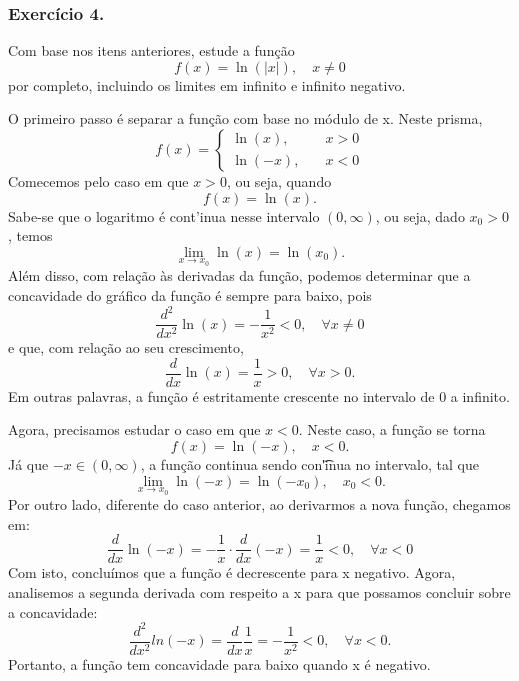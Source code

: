 \subsubsection{Exerc\'icio 4.}
Com base nos itens anteriores, estude a fun\c c\~ao
\[
	f(x) = \ln(|x|), \quad x\neq{0}
\]
por completo, incluindo os limites em infinito e infinito negativo.

\begin{proof*}
	O primeiro passo \'e separar a fun\c c\~ao com base no m\'odulo de x. Neste
	prisma,
	\[
		f(x) = \left\{
		\begin{array}{ll}
			\ln(x), \quad  & x > 0 \\
			\ln(-x), \quad & x < 0
		\end{array}\right.
	\]
	Comecemos pelo caso em que $x > 0$, ou seja, quando
	\[
		f(x) = \ln(x).
	\]
	Sabe-se que o logaritmo \'e cont'inua nesse intervalo $(0, \infty)$, ou seja,
	dado $x_{0}> 0$, temos
	\[
		\lim_{x\to{x_0}}\ln(x) = \ln(x_{0}).
	\]
	Al\'em disso, com rela\c c\~ao \`as derivadas da fun\c c\~ao, podemos
	determinar que a concavidade do gr\'afico da fun\c c\~ao \'e sempre para baixo,
	pois
	\[
		\frac{d^{2}}{dx^{2}}\ln(x) = -\frac{1}{x^{2}}< 0, \quad \forall x\neq0
	\]
	e que, com rela\c c\~ao ao seu crescimento,
	\[
		\frac{d}{dx}\ln(x) = \frac{1}{x}> 0, \quad \forall x > 0.
	\]
	Em outras palavras, a fun\c c\~ao \'e estritamente crescente no intervalo de 0
	a infinito.

	Agora, precisamos estudar o caso em que $x < 0$. Neste caso, a fun\c c\~ao se torna
	\[
		f(x) = \ln(-x),\quad x < 0.
	\]
	J\'a que $-x\in(0, \infty)$, a fun\c c\~ao continua sendo con\t'inua no
	intervalo, tal que
	\[
		\lim_{x\to{x_0}}\ln(-x) = \ln(-x_{0}), \quad x_{0}< 0.
	\]
	Por outro lado, diferente do caso anterior, ao derivarmos a nova fun\c c\~ao, chegamos
	em:
	\[
		\frac{d}{dx}\ln(-x) = -\frac{1}{x}\cdot\frac{d}{dx}(-x) = \frac{1}{x}< 0, \quad \forall x < 0
	\]
	Com isto, conclu\'imos que a fun\c c\~ao \'e decrescente para x negativo.
	Agora, analisemos a segunda derivada com respeito a x para que possamos concluir
	sobre a concavidade:
	\[
		\frac{d^{2}}{d x^{2}}ln(-x) = \frac{d}{dx}\frac{1}{x}= -\frac{1}{x^{2}}< 0, \quad \forall x < 0.
	\]
	Portanto, a fun\c c\~ao tem concavidade para baixo quando x \'e negativo.


\end{proof*}
